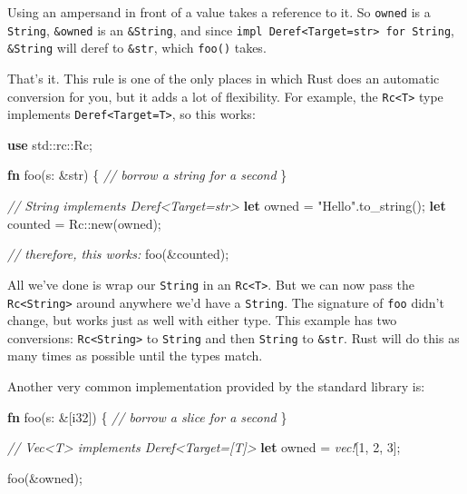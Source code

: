 \documentclass[a4paper,]{book}
\newenvironment{Shaded}{\begin{snugshade}}{\end{snugshade}}
\newcommand{\KeywordTok}[1]{\textcolor[rgb]{0.13,0.29,0.53}{\textbf{{#1}}}}
\newcommand{\DataTypeTok}[1]{\textcolor[rgb]{0.13,0.29,0.53}{{#1}}}
\newcommand{\DecValTok}[1]{\textcolor[rgb]{0.00,0.00,0.81}{{#1}}}
\newcommand{\StringTok}[1]{\textcolor[rgb]{0.31,0.60,0.02}{{#1}}}
\newcommand{\CommentTok}[1]{\textcolor[rgb]{0.56,0.35,0.01}{\textit{{#1}}}}
\newcommand{\PreprocessorTok}[1]{\textcolor[rgb]{0.56,0.35,0.01}{\textit{{#1}}}}
\newcommand{\NormalTok}[1]{{#1}}
\begin{document}
Using an ampersand in front of a value takes a reference to it. So
\texttt{owned} is a \texttt{String}, \texttt{\&owned} is an
\texttt{\&String}, and since
\texttt{impl\ Deref\textless{}Target=str\textgreater{}\ for\ String},
\texttt{\&String} will deref to \texttt{\&str}, which \texttt{foo()}
takes.

That's it. This rule is one of the only places in which Rust does an
automatic conversion for you, but it adds a lot of flexibility. For
example, the \texttt{Rc\textless{}T\textgreater{}} type implements
\texttt{Deref\textless{}Target=T\textgreater{}}, so this works:

\begin{Shaded}
\begin{Highlighting}[]
\KeywordTok{use} \NormalTok{std::rc::Rc;}

\KeywordTok{fn} \NormalTok{foo(s: &}\DataTypeTok{str}\NormalTok{) \{}
    \CommentTok{// borrow a string for a second}
\NormalTok{\}}

\CommentTok{// String implements Deref<Target=str>}
\KeywordTok{let} \NormalTok{owned = }\StringTok{"Hello"}\NormalTok{.to_string();}
\KeywordTok{let} \NormalTok{counted = Rc::new(owned);}

\CommentTok{// therefore, this works:}
\NormalTok{foo(&counted);}
\end{Highlighting}
\end{Shaded}

All we've done is wrap our \texttt{String} in an
\texttt{Rc\textless{}T\textgreater{}}. But we can now pass the
\texttt{Rc\textless{}String\textgreater{}} around anywhere we'd have a
\texttt{String}. The signature of \texttt{foo} didn't change, but works
just as well with either type. This example has two conversions:
\texttt{Rc\textless{}String\textgreater{}} to \texttt{String} and then
\texttt{String} to \texttt{\&str}. Rust will do this as many times as
possible until the types match.

Another very common implementation provided by the standard library is:

\begin{Shaded}
\begin{Highlighting}[]
\KeywordTok{fn} \NormalTok{foo(s: &[}\DataTypeTok{i32}\NormalTok{]) \{}
    \CommentTok{// borrow a slice for a second}
\NormalTok{\}}

\CommentTok{// Vec<T> implements Deref<Target=[T]>}
\KeywordTok{let} \NormalTok{owned = }\PreprocessorTok{vec!}\NormalTok{[}\DecValTok{1}\NormalTok{, }\DecValTok{2}\NormalTok{, }\DecValTok{3}\NormalTok{];}

\NormalTok{foo(&owned);}
\end{Highlighting}
\end{Shaded}
\end{document}
